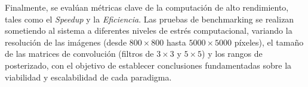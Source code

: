 Finalmente, se evalúan métricas clave de la computación de alto rendimiento, tales como el \textit{Speedup} y la \textit{Eficiencia}. Las pruebas de benchmarking se realizan sometiendo al sistema a diferentes niveles de estrés computacional, variando la resolución de las imágenes (desde $800 \times 800$ hasta $5000 \times 5000$ píxeles), el tamaño de las matrices de convolución (filtros de $3 \times 3$ y $5 \times 5$) y los rangos de posterizado, con el objetivo de establecer conclusiones fundamentadas sobre la viabilidad y escalabilidad de cada paradigma.